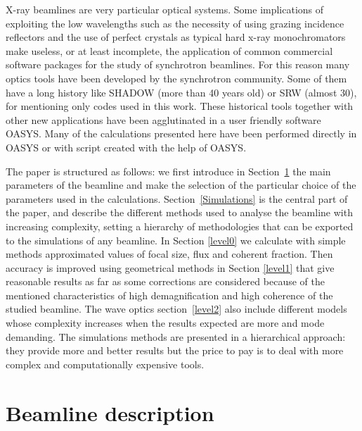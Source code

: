\documentclass{iucr}              %
\begin{document}
X-ray beamlines are very particular optical systems. Some implications of exploiting the low wavelengths such as the necessity of using grazing incidence reflectors and the use of perfect crystals as typical hard x-ray monochromators make useless, or at least incomplete, the application of common commercial software packages for the study of synchrotron beamlines. For this reason many optics tools have been developed by the synchrotron community. Some of them have a long history like SHADOW (more than 40 years old) or SRW (almost 30), for mentioning only codes used in this work. These historical tools together with other new applications have been agglutinated in a user friendly software OASYS. Many of the calculations presented here have been performed directly in OASYS or with script created with the help of OASYS. 


The paper is structured as follows: we first introduce in Section~\ref{Beamline description} the main parameters of the beamline and make the selection of the particular choice of the parameters used in the calculations. Section~\ref{Simulations} is the central part of the paper, and describe the different methods used to analyse the beamline with increasing complexity, setting a hierarchy of methodologies that can be exported to the simulations of any beamline. In Section \ref{level0} we calculate with simple methods approximated values of focal size, flux and coherent fraction. Then accuracy is improved using geometrical methods in Section \ref{level1} that give reasonable results as far as some corrections are considered because of the  mentioned characteristics of high demagnification and high coherence of the studied beamline. The wave optics section~\ref{level2} also include different models whose complexity increases when the results expected are more and mode demanding. The simulations methods are presented in a hierarchical approach:  they provide more and better results but the price to pay is to deal with more complex and computationally expensive tools. 


\section{Beamline description}
\label{Beamline description}
\end{document}
